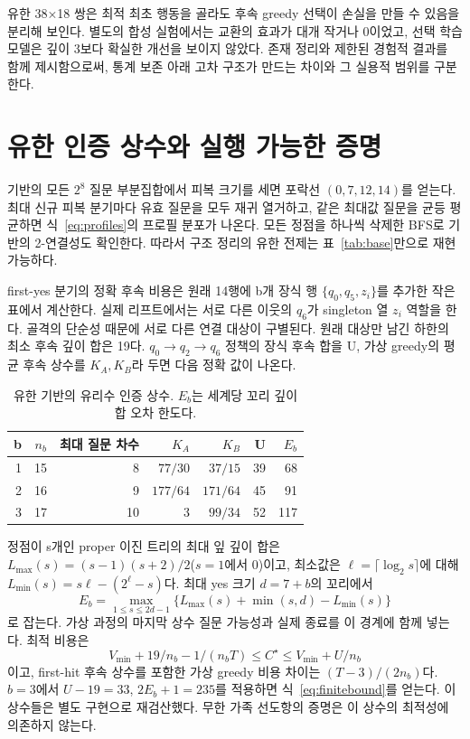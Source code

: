 \documentclass[11pt,a4paper]{article}
\theoremstyle{definition}
\theoremstyle{remark}\newtheorem{remark}[theorem]{주석}
\newcommand{\Opt}{C^{\star}}
\begin{document}
유한 38×18 쌍은 최적 최초 행동을 골라도 후속 greedy 선택이 손실을 만들 수 있음을 분리해 보인다. 별도의 합성 실험에서는 교환의 효과가 대개 작거나 0이었고, 선택 학습 모델은 깊이 3보다 확실한 개선을 보이지 않았다. 존재 정리와 제한된 경험적 결과를 함께 제시함으로써, 통계 보존 아래 고차 구조가 만드는 차이와 그 실용적 범위를 구분한다.

\appendix
\section{유한 인증 상수와 실행 가능한 증명}\label{app:cert}
기반의 모든 $2^8$ 질문 부분집합에서 피복 크기를 세면 포락선 $(0,7,12,14)$를 얻는다. 최대 신규 피복 분기마다 유효 질문을 모두 재귀 열거하고, 같은 최대값 질문을 균등 평균하면 식~\eqref{eq:profiles}의 프로필 분포가 나온다. 모든 정점을 하나씩 삭제한 BFS로 기반의 2-연결성도 확인한다. 따라서 구조 정리의 유한 전제는 표~\ref{tab:base}만으로 재현 가능하다.

first-yes 분기의 정확 후속 비용은 원래 14행에 b개 장식 행 $\{q_0,q_5,z_i\}$를 추가한 작은 표에서 계산한다. 실제 리프트에서는 서로 다른 이웃의 $q_6$가 singleton 열 $z_i$ 역할을 한다. 골격의 단순성 때문에 서로 다른 연결 대상이 구별된다. 원래 대상만 남긴 하한의 최소 후속 깊이 합은 19다. $q_0\to q_2\to q_6$ 정책의 장식 후속 합을 U, 가상 greedy의 평균 후속 상수를 $K_A,K_B$라 두면 다음 정확 값이 나온다.

\begin{table}[htbp]\centering\small
\caption{유한 기반의 유리수 인증 상수. $E_b$는 세계당 꼬리 깊이 합 오차 한도다.}\label{tab:constants}
\begin{tabular}{rrrrrrr}\toprule
b&$n_b$&최대 질문 차수&$K_A$&$K_B$&U&$E_b$\\\midrule
1&15&8&$77/30$&$37/15$&39&68\\
2&16&9&$177/64$&$171/64$&45&91\\
3&17&10&3&$99/34$&52&117\\\bottomrule
\end{tabular}
\end{table}

정점이 s개인 proper 이진 트리의 최대 잎 깊이 합은 $L_{\max}(s)=(s-1)(s+2)/2$($s=1$에서 0)이고, 최소값은 $\ell=\lceil\log_2s\rceil$에 대해 $L_{\min}(s)=s\ell-(2^\ell-s)$다. 최대 yes 크기 $d=7+b$의 꼬리에서
\begin{equation}
 E_b=\max_{1\le s\le2d-1}\{L_{\max}(s)+\min(s,d)-L_{\min}(s)\}
\end{equation}
로 잡는다. 가상 과정의 마지막 상수 질문 가능성과 실제 종료를 이 경계에 함께 넣는다. 최적 비용은
\begin{equation}
 V_{\min}+19/n_b-1/(n_bT)\le\Opt\le V_{\min}+U/n_b
\end{equation}
이고, first-hit 후속 상수를 포함한 가상 greedy 비용 차이는 $(T-3)/(2n_b)$다. $b=3$에서 $U-19=33$, $2E_b+1=235$를 적용하면 식~\eqref{eq:finitebound}를 얻는다. 이 상수들은 별도 구현으로 재검산했다. 무한 가족 선도항의 증명은 이 상수의 최적성에 의존하지 않는다.
\end{document}
